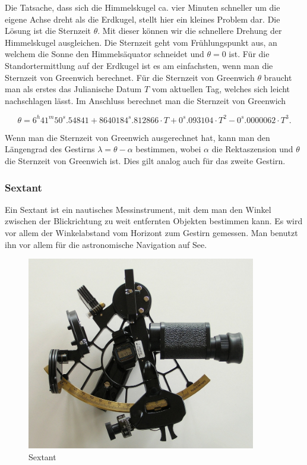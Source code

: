 Die Tatsache, dass sich die Himmelskugel  ca. vier Minuten schneller um die eigene Achse dreht als die Erdkugel, stellt hier ein kleines Problem dar.
Die Lösung ist die Sternzeit $\theta$. 
Mit dieser können wir die schnellere Drehung der Himmelskugel ausgleichen.
Die Sternzeit geht vom Frühlungspunkt aus, an welchem die Sonne den Himmelsäquator schneidet und $\theta=0$ ist. 
Für die Standortermittlung auf der Erdkugel ist es am einfachsten, wenn man die Sternzeit von Greenwich berechnet. 
Für die Sternzeit von Greenwich $\theta$ braucht man als erstes das Julianische Datum $T$ vom aktuellen Tag, welches sich leicht nachschlagen lässt.
Im Anschluss berechnet man die Sternzeit von Greenwich

\[\theta = 6^h 41^m 50^s.54841 + 8640184^s.812866 \cdot T + 0^s.093104 \cdot T^2 - 0^s.0000062 \cdot T^3.\]

Wenn man die Sternzeit von Greenwich ausgerechnet hat, kann man den Längengrad des Gestirns $\lambda = \theta - \alpha$ bestimmen, wobei $\alpha$ die Rektaszension und $\theta$ die Sternzeit von Greenwich ist.
Dies gilt analog auch für das zweite Gestirn.
\subsubsection{Sextant}
Ein Sextant ist ein nautisches Messinstrument, mit dem man den Winkel zwischen der Blickrichtung zu weit entfernten Objekten bestimmen kann. Es wird vor allem der Winkelabstand vom Horizont zum Gestirn gemessen. 
Man benutzt ihn vor allem für die astronomische Navigation auf See.

\begin{figure}
	\begin{center}
		\includegraphics[width=10cm]{papers/nav/bilder/sextant.jpg}
		\caption[Sextant]{Sextant}
	\end{center}
\end{figure}
